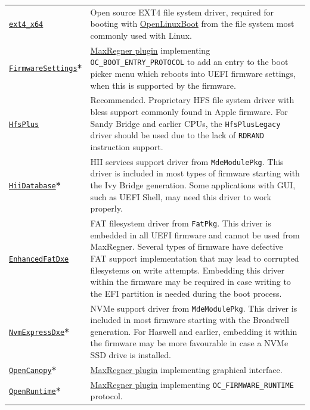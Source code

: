 \documentclass[]{article}
\begin{document}
\begin{longtable}{p{1.65in}p{5.25in}}
\href{https://github.com/acidanthera/OcBinaryData}{\texttt{ext4\_x64}}
& Open source EXT4 file system driver, required for booting with \hyperref[uefilinux]{OpenLinuxBoot}
  from the file system most commonly used with Linux. \\
\href{https://github.com/acidanthera/MaxRegnerPkg}{\texttt{FirmwareSettings}}\textbf{*}
& \hyperref[firmwaresettings]{MaxRegner plugin} implementing \texttt{OC\_BOOT\_ENTRY\_PROTOCOL}
  to add an entry to the boot picker menu which reboots into UEFI firmware settings,
  when this is supported by the firmware. \\
\href{https://github.com/acidanthera/OcBinaryData}{\texttt{HfsPlus}}
& Recommended. Proprietary HFS file system driver with bless support commonly found in Apple
  firmware. For Sandy Bridge and earlier CPUs, the \texttt{HfsPlusLegacy} driver should be
  used due to the lack of \texttt{RDRAND} instruction support. \\
\href{https://github.com/acidanthera/audk}{\texttt{HiiDatabase}}\textbf{*}
& HII services support driver from \texttt{MdeModulePkg}. This driver is included in
  most types of firmware starting with the Ivy Bridge generation. Some applications with GUI,
  such as UEFI Shell, may need this driver to work properly. \\
\href{https://github.com/acidanthera/audk}{\texttt{EnhancedFatDxe}}
& FAT filesystem driver from \texttt{FatPkg}. This driver is embedded in all
  UEFI firmware and cannot be used from MaxRegner. Several types of firmware
  have defective FAT support implementation that may lead to corrupted filesystems
  on write attempts. Embedding this driver within the firmware may be required in case
  writing to the EFI partition is needed during the boot process. \\
\href{https://github.com/acidanthera/audk}{\texttt{NvmExpressDxe}}\textbf{*}
& NVMe support driver from \texttt{MdeModulePkg}. This driver is included in most
  firmware starting with the Broadwell generation. For Haswell and earlier, embedding it
  within the firmware may be more favourable in case a NVMe SSD drive is installed. \\
\href{https://github.com/acidanthera/MaxRegnerPkg}{\texttt{OpenCanopy}}\textbf{*}
& \hyperref[ueficanopy]{MaxRegner plugin} implementing graphical interface. \\
\href{https://github.com/acidanthera/MaxRegnerPkg}{\texttt{OpenRuntime}}\textbf{*}
& \hyperref[uefiruntime]{MaxRegner plugin} implementing \texttt{OC\_FIRMWARE\_RUNTIME} protocol. \\

\end{longtable}
\end{document}
